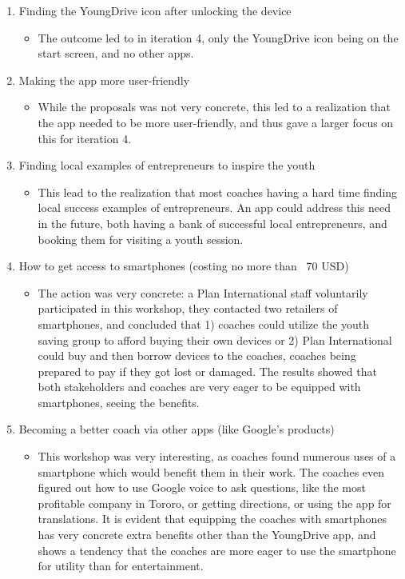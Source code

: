   \begin{enumerate}
  \item Finding the YoungDrive icon after unlocking the device
  \begin{itemize}
    \item The outcome led to in iteration 4, only the YoungDrive icon being on the start screen, and no other apps.
  \end{itemize}
  \item Making the app more user-friendly
  \begin{itemize}
    \item While the proposals was not very concrete, this led to a realization that the app needed to be more user-friendly, and thus gave a larger focus on this for iteration 4.
  \end{itemize}
  \item Finding local examples of entrepreneurs to inspire the youth
  \begin{itemize}
    \item This lead to the realization that most coaches having a hard time finding local success examples of entrepreneurs. An app could address this need in the future, both having a bank of successful local entrepreneurs, and booking them for visiting a youth session.
  \end{itemize}
  \item How to get access to smartphones (costing no more than ~70 USD)
  \begin{itemize}
    \item The action was very concrete: a Plan International staff voluntarily participated in this workshop, they contacted two retailers of smartphones, and concluded that 1) coaches could utilize the youth saving group to afford buying their own devices or 2) Plan International could buy and then borrow devices to the coaches, coaches being prepared to pay if they got lost or damaged. The results showed that both stakeholders and coaches are very eager to be equipped with smartphones, seeing the benefits.
  \end{itemize}
  \item Becoming a better coach via other apps (like Google's products)
  \begin{itemize}
    \item This workshop was very interesting, as coaches found numerous uses of a smartphone which would benefit them in their work. The coaches even figured out how to use Google voice to ask questions, like the most profitable company in Tororo, or getting directions, or using the app for translations. It is evident that equipping the coaches with smartphones has very concrete extra benefits other than the YoungDrive app, and shows a tendency that the coaches are more eager to use the smartphone for utility than for entertainment.
  \end{itemize}
  \end{enumerate}
